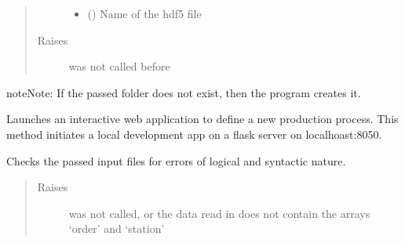 \documentclass[letterpaper,10pt,english]{sphinxmanual}
\begin{document}
\begin{fulllineitems}
\begin{fulllineitems}
\begin{quote}
\begin{description}
\begin{itemize}
\item {} 
\sphinxAtStartPar
{} () \textendash{} Name of the hdf5 file

\end{itemize}

\item[{Raises}] \leavevmode
\sphinxAtStartPar
{} \textendash{}  was not called before

\end{description}\end{quote}

\begin{sphinxadmonition}{note}{Note:}
\sphinxAtStartPar
If the passed folder does not exist, then the program creates it.
\end{sphinxadmonition}

\end{fulllineitems}


\begin{fulllineitems}
\label{\detokenize{source/API/api:environment.Environment.define_process}}
\sphinxAtStartPar
Launches an interactive web application to define a new production process.
This method initiates a local development app on a flask server on localhoast:8050.

\end{fulllineitems}


\begin{fulllineitems}
\label{\detokenize{source/API/api:environment.Environment.inspect}}
\sphinxAtStartPar
Checks the passed input files for errors of logical and syntactic nature.
\begin{quote}\begin{description}
\item[{Raises}] \leavevmode
\sphinxAtStartPar
{} \textendash{}  was not called, or the data read in does not contain the arrays
‘order’ and ‘station’


\end{description}
\end{quote}
\end{fulllineitems}
\end{fulllineitems}
\end{document}

